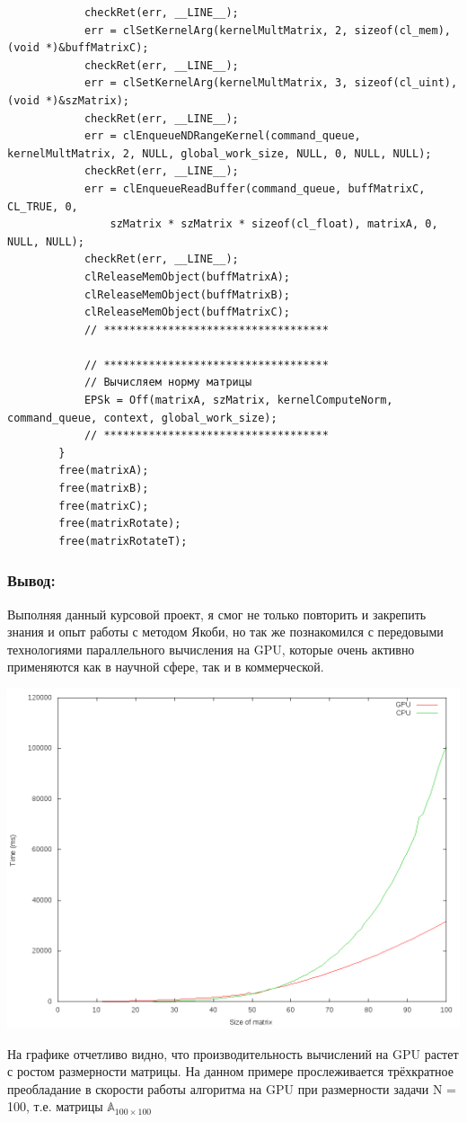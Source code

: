 \documentclass[utf8, 12pt, a4paper, oneside]{article}
\begin{document}
\begin{lstlisting}
            checkRet(err, __LINE__);            
            err = clSetKernelArg(kernelMultMatrix, 2, sizeof(cl_mem), (void *)&buffMatrixC);
            checkRet(err, __LINE__);                        
            err = clSetKernelArg(kernelMultMatrix, 3, sizeof(cl_uint), (void *)&szMatrix);
            checkRet(err, __LINE__);                                    
            err = clEnqueueNDRangeKernel(command_queue, kernelMultMatrix, 2, NULL, global_work_size, NULL, 0, NULL, NULL);
            checkRet(err, __LINE__);
            err = clEnqueueReadBuffer(command_queue, buffMatrixC, CL_TRUE, 0, 
                szMatrix * szMatrix * sizeof(cl_float), matrixA, 0, NULL, NULL);
            checkRet(err, __LINE__);
            clReleaseMemObject(buffMatrixA);
            clReleaseMemObject(buffMatrixB);
            clReleaseMemObject(buffMatrixC);
			// ***********************************            						
	
			// ***********************************            			
			// Вычисляем норму матрицы
            EPSk = Off(matrixA, szMatrix, kernelComputeNorm, command_queue, context, global_work_size);
			// ***********************************            			            
        }
        free(matrixA);
        free(matrixB);
        free(matrixC);
        free(matrixRotate);
        free(matrixRotateT);
\end{lstlisting}

\subsubsection*{Вывод:}
Выполняя данный курсовой проект, я смог не только повторить и закрепить знания и опыт работы с методом Якоби, но так же познакомился с передовыми технологиями параллельного вычисления на GPU, которые очень активно применяются как в научной сфере, так и в коммерческой.

\begin{center}
\includegraphics[scale=0.5]{graphic.png}
\end{center}

На графике отчетливо видно, что производительность вычислений на GPU растет с ростом размерности матрицы. На данном примере прослеживается трёхкратное преобладание в скорости работы алгоритма на GPU при размерности задачи N = 100, т.е. матрицы $\mathbb{A}_{100\times100}$
\end{document}
